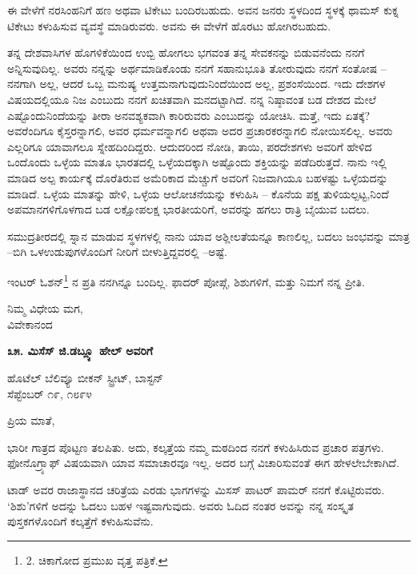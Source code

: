 ಈ ವೇಳೆಗೆ ನರಸಿಂಹನಿಗೆ ಹಣ ಅಥವಾ ಟಿಕೇಟು ಬಂದಿರಬಹುದು. ಅವನ ಜನರು ಸ್ಥಳದಿಂದ ಸ್ಥಳಕ್ಕೆ ಥಾಮಸ್ ಕುಕ್ನ ಟಿಕೇಟು ಕಳುಹಿಸುವ ವ್ಯವಸ್ಥೆ ಮಾಡಿರುವರು. ಅವನು ಈ ವೇಳೆಗೆ ಹೊರಟು ಹೋಗಿರಬಹುದು.

ತನ್ನ ದೇಶವಾಸಿಗಳ ಹೊಗಳಿಕೆಯಿಂದ ಉಬ್ಬಿ ಹೋಗಲು ಭಗವಂತ ತನ್ನ ಸೇವಕನನ್ನು ಬಿಡುವನೆಂದು ನನಗೆ ಅನ್ನಿಸುವುದಿಲ್ಲ. ಅವರು ನನ್ನನ್ನು ಅರ್ಥಮಾಡಿಕೊಂಡು ನನಗೆ ಸಹಾನುಭೂತಿ ತೋರುವುದು ನನಗೆ ಸಂತೋಷ – ನನಗಾಗಿ ಅಲ್ಲ, ಆದರೆ ಒಬ್ಬ ಮನುಷ್ಯ ಉತ್ತಮನಾಗುವುದುನಿಂದೆಯಿಂದ ಅಲ್ಲ, ಪ್ರಶಂಸೆಯಿಂದ. ಇದು ದೇಶಗಳ ವಿಷಯದಲ್ಲಿಯೂ ನಿಜ ಎಂಬುದು ನನಗೆ ಖಚಿತವಾಗಿ ಮನದಟ್ಟಾಗಿದೆ. ನನ್ನ ನಿಷ್ಠಾವಂತ ಬಡ ದೇಶದ ಮೇಲೆ ಎಷ್ಟೊಂದುನಿಂದೆಯನ್ನು ತೀರಾ ಅನವಶ್ಯಕವಾಗಿ ಕಾರಿರುವರು ಎಂಬುದನ್ನು ಯೋಚಿಸಿ. ಮತ್ತೆ, ಇದು ಏತಕ್ಕೆ? ಅವರೆಂದಿಗೂ ಕೈಸ್ತರನ್ನಾಗಲಿ, ಅವರ ಧರ್ಮವನ್ನಾಗಲಿ ಅಥವಾ ಅದರ ಪ್ರಚಾರಕರನ್ನಾಗಲಿ ನೋಯಿಸಲಿಲ್ಲ. ಅವರು ಎಲ್ಲರಿಗೂ ಯಾವಾಗಲೂ ಸ್ನೇಹದಿಂದಿದ್ದರು. ಆದುದರಿಂದ ನೋಡಿ, ತಾಯಿ, ಪರದೇಶಗಳು ಅವರಿಗೆ ಹೇಳಿದ ಒಂದೊಂದು ಒಳ್ಳೆಯ ಮಾತೂ ಭಾರತದಲ್ಲಿ ಒಳ್ಳೆಯದಕ್ಕಾಗಿ ಅಷ್ಟೊಂದು ಶಕ್ತಿಯನ್ನು ಪಡೆದಿರುತ್ತದೆ. ನಾನು ಇಲ್ಲಿ ಮಾಡಿದ ಅಲ್ಪ ಕಾರ್ಯಕ್ಕೆ ದೊರೆತಿರುವ ಅಮೆರಿಕಾದ ಮೆಚ್ಚುಗೆ ಅವರಿಗೆ ನಿಜವಾಗಿಯೂ ಬಹಳಷ್ಟು ಒಳ್ಳೆಯದನ್ನು ಮಾಡಿದೆ. ಒಳ್ಳೆಯ ಮಾತನ್ನು ಹೇಳಿ, ಒಳ್ಳೆಯ ಆಲೋಚನೆಯನ್ನು ಕಳುಹಿಸಿ – ಕೊನೆಯ ಪಕ್ಷ ತುಳಿಯಲ್ಪಟ್ಟ,ನಿಂದೆ ಅಪಮಾನಗಳಿಗೊಳಗಾದ ಬಡ ಲಕ್ಷೋಪಲಕ್ಷ ಭಾರತೀಯರಿಗೆ, ಅವರನ್ನು ಹಗಲು ರಾತ್ರಿ ಬೈಯುವ ಬದಲು.

ಸಮುದ್ರತೀರದಲ್ಲಿ ಸ್ನಾನ ಮಾಡುವ ಸ್ಥಳಗಳಲ್ಲಿ ನಾನು ಯಾವ ಅಶ್ಲೀಲತೆಯನ್ನೂ ಕಾಣಲಿಲ್ಲ, ಬದಲು ಜಂಭವನ್ನು ಮಾತ್ರ –ಬಿಗಿ ಒಳಉಡುಪುಗಳೊಂದಿಗೆ ನೀರಿಗೆ ಬೀಳುತ್ತಿದ್ದವರಲ್ಲಿ –ಅಷ್ಟೆ.

ಇಂಟರ್ ಓಶನ್\footnote{2. ಚಿಕಾಗೋದ ಪ್ರಮುಖ ವೃತ್ತ ಪತ್ರಿಕೆ.} ನ ಪ್ರತಿ ನನಗಿನ್ನೂ ಬಂದಿಲ್ಲ. ಫಾದರ್ ಪೋಪ್ಗೆ, ಶಿಶುಗಳಿಗೆ, ಮತ್ತು ನಿಮಗೆ ನನ್ನ ಪ್ರೀತಿ.

\begin{flushright}
ನಿಮ್ಮ ವಿಧೇಯ ಮಗ,\\ವಿವೇಕಾನಂದ
\end{flushright}

\begin{center}
\textbf{೩೫. ಮಿಸೆಸ್ ಜಿ.ಡಬ್ಲ್ಯೂ ಹೇಲ್ ಅವರಿಗೆ}
\end{center}

\begin{flushright}
ಹೊಟೆಲ್ ಬೆಲಿವ್ಯೂ ಬೀಕನ್ ಸ್ಟ್ರೀಟ್, ಬಾಸ್ಟನ್\\ಸೆಪ್ಟೆಂಬರ್ ೧೯, ೧೮೯೪
\end{flushright}

ಪ್ರಿಯ ಮಾತೆ,

ಭಾರೀ ಗಾತ್ರದ ಪೊಟ್ಟಣ ತಲಪಿತು. ಅದು, ಕಲ್ಕತ್ತೆಯ ನಮ್ಮ ಮಠದಿಂದ ನನಗೆ ಕಳುಹಿಸಿರುವ ಪ್ರಚಾರ ಪತ್ರಗಳು. ಫೋನೊಗ್ರ್ಯಾಫ್ ವಿಷಯವಾಗಿ ಯಾವ ಸಮಾಚಾರವೂ ಇಲ್ಲ. ಅದರ ಬಗ್ಗೆ ವಿಚಾರಿಸುವಂತೆ ಈಗ ಹೇಳಲೇಬೇಕಾಗಿದೆ.

ಟಾಡ್ ಅವರ ರಾಜಾಸ್ಥಾನದ ಚರಿತ್ರೆಯ ಎರಡು ಭಾಗಗಳನ್ನು ಮಿಸಸ್ ಪಾಟರ್ ಪಾಮರ್ ನನಗೆ ಕೊಟ್ಟಿರುವರು. ‘ಶಿಶು’ಗಳಿಗೆ ಅದನ್ನು ಓದಲು ಬಹಳ ಇಷ್ಟವಾಗುವುದು. ಅವರು ಓದಿದ ನಂತರ ಅವನ್ನು ನನ್ನ ಸಂಸ್ಕೃತ ಪುಸ್ತಕಗಳೊಂದಿಗೆ ಕಲ್ಕತ್ತೆಗೆ ಕಳುಹಿಸುವೆನು.

